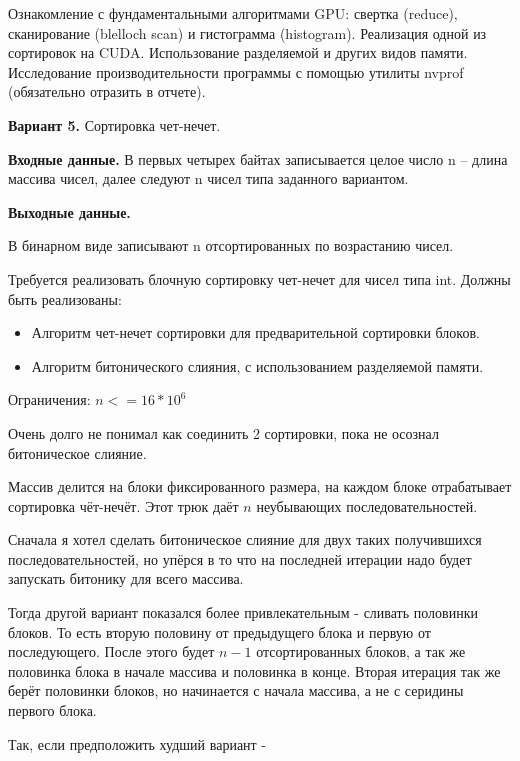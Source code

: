 \documentclass[12pt]{article}
\begin{document}


Ознакомление с фундаментальными алгоритмами GPU: свертка
(reduce), сканирование (blelloch scan) и гистограмма (histogram). Реализация одной из
сортировок на CUDA. Использование разделяемой и других видов памяти.
Исследование производительности программы с помощью утилиты nvprof
(обязательно отразить в отчете).

\textbf{Вариант 5.} Сортировка чет-нечет.

\textbf{Входные данные.}
В первых четырех байтах записывается целое число n --
длина массива чисел, далее следуют n чисел типа заданного вариантом.

\textbf{Выходные данные.}

В бинарном виде записывают n отсортированных по
возрастанию чисел.


Требуется реализовать блочную сортировку чет-нечет для чисел типа int.
Должны быть реализованы:

\begin{itemize}
	\item Алгоритм чет-нечет сортировки для предварительной сортировки
	      блоков.
	\item Алгоритм битонического слияния, с использованием разделяемой
	      памяти.
\end{itemize}

Ограничения: $n <= 16 * 10^6$

\nvidia


Очень долго не понимал как соединить 2 сортировки, пока не осознал битоническое слияние.

Массив делится на блоки фиксированного размера, на каждом блоке отрабатывает сортировка чёт-нечёт.
Этот трюк даёт $n$ неубывающих последовательностей.

Сначала я хотел сделать битоническое слияние для двух таких получившихся последовательностей,
но упёрся в то что на последней итерации надо будет запускать битонику для всего массива.

Тогда другой вариант показался более привлекательным - сливать половинки блоков.
То есть вторую половину от предыдущего блока и первую от последующего.
После этого будет $n-1$ отсортированных блоков, а так же половинка блока в начале массива и половинка в конце.
Вторая итерация так же берёт половинки блоков, но начинается с начала массива, а не с серидины первого блока.

Так, если предположить худший вариант - 

{
}

\newpage


\end{document}
